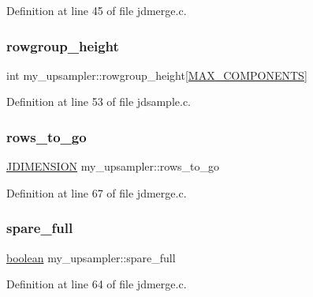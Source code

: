 Definition at line 45 of file jdmerge.\+c.

\mbox{\label{structmy__upsampler_a05806e1394a2638e4912da137b9d4bcd}} 
\subsubsection{\texorpdfstring{rowgroup\_height}{rowgroup\_height}}
{\footnotesize\ttfamily int my\+\_\+upsampler\+::rowgroup\+\_\+height\mbox{[}\mbox{\hyperlink{jmorecfg_8h_a6d8c910a1fdb6d4762a05f7250e64322}{M\+A\+X\+\_\+\+C\+O\+M\+P\+O\+N\+E\+N\+TS}}\mbox{]}}



Definition at line 53 of file jdsample.\+c.

\mbox{\label{structmy__upsampler_a1a6b9998ad6a7501dd5287295fd8adc4}} 
\subsubsection{\texorpdfstring{rows\_to\_go}{rows\_to\_go}}
{\footnotesize\ttfamily \mbox{\hyperlink{jmorecfg_8h_a04ed4674f6f1d0d50ec241531e38274f}{J\+D\+I\+M\+E\+N\+S\+I\+ON}} my\+\_\+upsampler\+::rows\+\_\+to\+\_\+go}



Definition at line 67 of file jdmerge.\+c.

\mbox{\label{structmy__upsampler_a98ee90ab9a83d6d1c16c073826c34e51}} 
\subsubsection{\texorpdfstring{spare\_full}{spare\_full}}
{\footnotesize\ttfamily \mbox{\hyperlink{jmorecfg_8h_a7c6368b321bd9acd0149b030bb8275ed}{boolean}} my\+\_\+upsampler\+::spare\+\_\+full}



Definition at line 64 of file jdmerge.\+c.

\mbox{\label{structmy__upsampler_a000b6953c558f05f68e56c2c08c12902}} 
